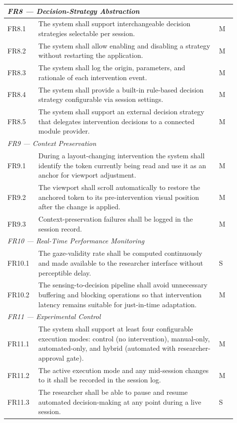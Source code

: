\begin{longtable}{%
  p{0.12\linewidth}
  p{0.73\linewidth}
  p{0.07\linewidth}
}
\multicolumn{3}{l}{\textit{FR8 — Decision-Strategy Abstraction}} \\
\midrule
FR8.1 & The system shall support interchangeable decision strategies
        selectable per session. & M \\
FR8.2 & The system shall allow enabling and disabling a strategy without
        restarting the application. & M \\
FR8.3 & The system shall log the origin, parameters, and rationale of each
        intervention event. & M \\
FR8.4 & The system shall provide a built-in rule-based decision strategy
        configurable via session settings. & M \\
FR8.5 & The system shall support an external decision strategy that delegates
        intervention decisions to a connected module provider. & M \\
\midrule

\multicolumn{3}{l}{\textit{FR9 — Context Preservation}} \\
\midrule
FR9.1 & During a layout-changing intervention the system shall identify the
        token currently being read and use it as an anchor for viewport
        adjustment. & M \\
FR9.2 & The viewport shall scroll automatically to restore the anchored token
        to its pre-intervention visual position after the change is applied. & M \\
FR9.3 & Context-preservation failures shall be logged in the session record. & M \\
\midrule

\multicolumn{3}{l}{\textit{FR10 — Real-Time Performance Monitoring}} \\
\midrule
FR10.1 & The gaze-validity rate shall be computed continuously and made
         available to the researcher interface without perceptible delay. & S \\
FR10.2 & The sensing-to-decision pipeline shall avoid unnecessary buffering
         and blocking operations so that intervention latency remains
         suitable for just-in-time adaptation. & M \\
\midrule

\multicolumn{3}{l}{\textit{FR11 — Experimental Control}} \\
\midrule
FR11.1 & The system shall support at least four configurable execution modes:
         control (no intervention), manual-only, automated-only, and hybrid
         (automated with researcher-approval gate). & M \\
FR11.2 & The active execution mode and any mid-session changes to it shall be
         recorded in the session log. & M \\
FR11.3 & The researcher shall be able to pause and resume automated
         decision-making at any point during a live session. & S \\
\midrule


\end{longtable}
